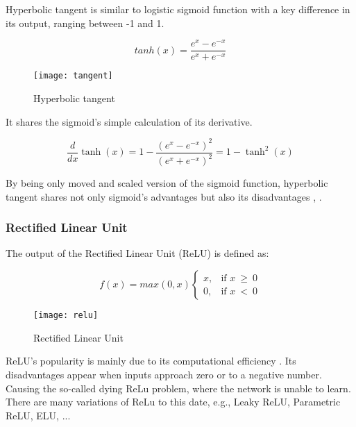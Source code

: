 Hyperbolic tangent is similar to logistic sigmoid function with a key difference in its output, ranging between -1 and 1.

\begin{equation}
    {tanh(x) = \frac{e^x - e^{-x}}{e^x + e^{-x}}}
\end{equation}


\begin{figure}[h]
    \centering
    \texttt{[image: tangent]}
    \caption{Hyperbolic tangent \cite{matous}}
    \label{fig:hyperbolictangent}
\end{figure}


It shares the sigmoid's simple calculation of its derivative.

\begin{equation}
    {\frac{d}{dx}\tanh(x) = 1 - \frac{(e^x - e^{-x})^2}{(e^x + e^{-x})^2} = 1 -\tanh^2(x)}
\end{equation}

By being only moved and scaled version of the sigmoid function, hyperbolic tangent shares not only sigmoid's advantages but also its disadvantages \cite{leskovec2020mining}, \cite{matous}.


\subsubsection{Rectified Linear Unit}

The output of the Rectified Linear Unit (ReLU) is defined as:

\begin{equation}
    f(x) = max(0,x)
\begin{cases}
    x, & \text{if $x\ \geq\ 0$}\\
    0, & \text{if $x\ <\ 0$}
\end{cases} 
\end{equation} 

\begin{figure}[h]
    \centering
    \texttt{[image: relu]}
    \caption{Rectified Linear Unit \cite{matous}}
    \label{fig:relu}
\end{figure}


ReLU's popularity is mainly due to its computational efficiency \cite{7typesactivationfunctions}. Its disadvantages appear when inputs approach zero or to a negative number. Causing the so-called dying ReLu problem, where the network is unable to learn. There are many variations of ReLu to this date, e.g., Leaky ReLU, Parametric ReLU, ELU, ...

